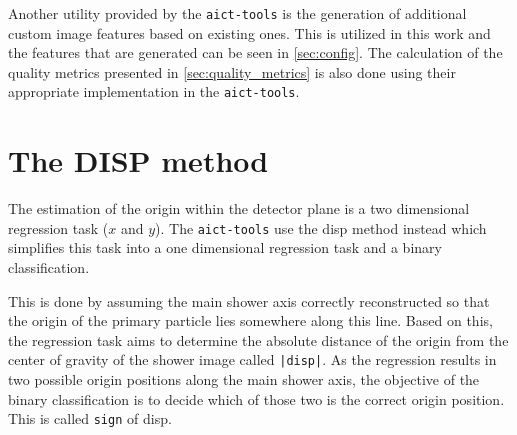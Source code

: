 Another utility provided by the \texttt{aict-tools} is the generation of additional custom image features based on existing ones.
This is utilized in this work and the features that are generated can be seen in \autoref{sec:config}. 
The calculation of the quality metrics presented in \autoref{sec:quality_metrics} is also done using their appropriate implementation in the \texttt{aict-tools}.


\section{The DISP method}
The estimation of the origin within the detector plane is a two dimensional regression task ($x$ and $y$).
The \texttt{aict-tools} use the disp method instead which simplifies this task into a one dimensional regression task and a binary classification.

This is done by assuming the main shower axis correctly reconstructed so that the origin of the primary particle lies somewhere along this line.
Based on this, the regression task aims to determine the absolute distance of the origin from the center of gravity of the shower image called \texttt{|disp|}.
As the regression results in two possible origin positions along the main shower axis, the objective of the binary classification is to decide which
of those two is the correct origin position.
This is called \texttt{sign} of disp.
